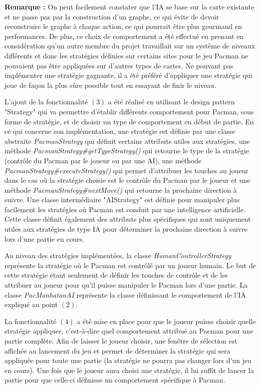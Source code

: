 \documentclass[12pt, openany]{report}
\begin{document}
\textbf{Remarque :} On peut facilement constater que l'IA se base sur la carte existante et ne passe pas par la construction d'un graphe, ce qui évite de devoir reconstruire le graphe à chaque action, ce qui pourrait être plus gourmand en performances. De plus, ce choix de comportement a été effectué en prenant en considération qu'un autre membre du projet travaillait sur un système de niveaux différents et donc les stratégies définies sur certains sites pour le jeu Pacman ne pouvaient pas être appliquées sur d'autres types de cartes. Ne pouvant pas implémenter une stratégie gagnante, il a été préféré d'appliquer une stratégie qui joue de façon la plus sûre possible tout en essayant de finir le niveau. 



L'ajout de la fonctionnalité $(3)$ a été réalisé en utilisant le design pattern "Strategy" qui va permettre d'établir différents comportement pour Pacman, sous forme de stratégie, et de choisir un type de comportement en début de partie. En ce qui concerne son implémentation, une stratégie est définie par une classe abstraite \mbox{\textit{PacmanStrategy}} qui définit certains attributs utiles aux stratégies, une méthode \mbox{\textit{PacmanStrategy\#getTypeStrategy()}} qui retourne le type de la stratégie (contrôle du Pacman par le joueur ou par une AI), une méthode \mbox{\textit{PacmanStrategy\#executeStrategy()}} qui permet d'attribuer les touches au joueur dans le cas où la stratégie choisie est le contrôle du Pacman par le joueur et une méthode \mbox{\textit{PacmanStrategy\#nextMove()}} qui retourne la prochaine direction à suivre. Une classe intermédiaire "AIStrategy" est définie pour manipuler plus facilement les stratégies où Pacman est conduit par une intelligence artificielle. Cette classe définit également des attributs plus spécifiques qui sont uniquement utiles aux stratégies de type IA pour déterminer la prochaine direction à suivre lors d'une partie en cours.

Au niveau des stratégies implémentées, la classe \mbox{\textit{HumanControllerStrategy}} représente la stratégie où le Pacman est contrôlé par un joueur humain. Le but de cette stratégie étant seulement de définir les touches de contrôle et de les attribuer au joueur pour qu'il puisse manipuler le Pacman lors d'une partie. La classe \mbox{\textit{PacManhatanAI}} représente la classe définissant le comportement de l'IA expliqué au point $(2)$.



La fonctionnalité $(4)$ a été mise en place pour que le joueur puisse choisir quelle stratégie appliquer, c'est-à-dire quel comportement attribué au Pacman pour une partie complète. Afin de laisser le joueur choisir, une fenêtre de sélection est affichée au lancement du jeu et permet de déterminer la stratégie qui sera appliquée pour toute une partie (la stratégie ne pourra pas changer lors d'un jeu en cours). Une fois que le joueur aura choisi une stratégie, il lui suffit de lancer la partie pour que celle-ci définisse un comportement spécifique à Pacman.
\end{document}
